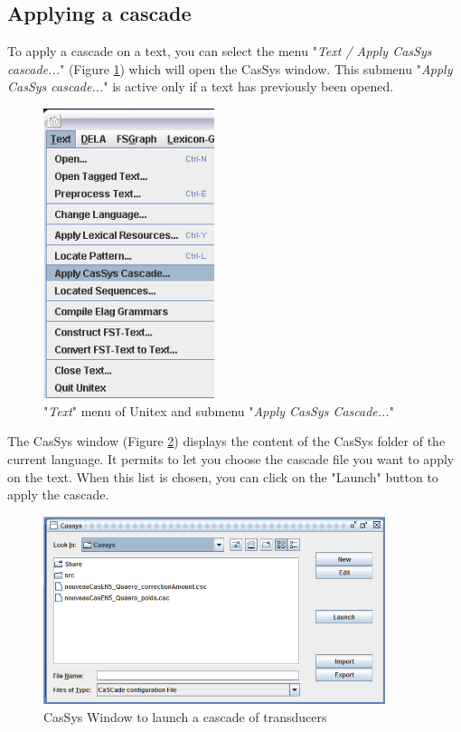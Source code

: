 	
\subsection{Applying a cascade}
\label{subsec:launchCascade}

To apply a cascade on a text, you can select the menu "\textit{Text / Apply CasSys cascade...}" (Figure \ref{fig13-01}) which will open the CasSys window.
This submenu "\textit{Apply CasSys cascade...}" is active only if a text has previously been opened.

\begin{figure}[!htb]
 \centering
 \includegraphics[width=5cm]{resources/img/fig13-01.png}
 \caption{"\textit{Text}" menu of Unitex and submenu "\textit{Apply CasSys Cascade...}"}
 \label{fig13-01}
\end{figure}


The CasSys window (Figure \ref{fig13-02}) displays the content of the CasSys folder of the current language. It permits to let you choose 
the cascade file you want to apply on the text. When this list is chosen, you can click on the "Launch" button to apply the cascade.

\begin{figure}[!htb]
  \centering
  \includegraphics[width=10cm]{resources/img/fig13-02.png}
  \caption{CasSys Window to launch a cascade of transducers}
  \label{fig13-02}
\end{figure}



